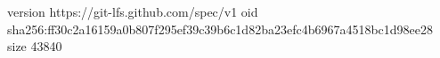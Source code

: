 version https://git-lfs.github.com/spec/v1
oid sha256:ff30c2a16159a0b807f295ef39c39b6c1d82ba23efc4b6967a4518bc1d98ee28
size 43840

